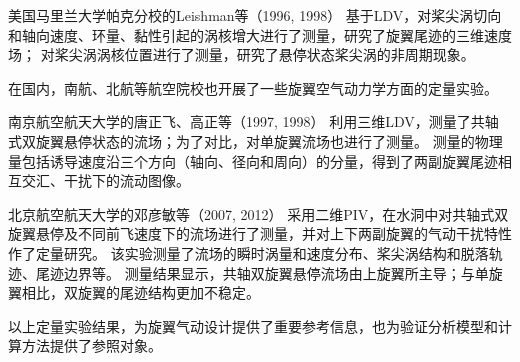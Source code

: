 \documentclass[doctor,openright,twoside,color]{buaathesis}
\begin{document}
美国马里兰大学帕克分校的Leishman等（1996, 1998）
基于LDV，对桨尖涡切向和轴向速度、环量、黏性引起的涡核增大进行了测量，研究了旋翼尾迹的三维速度场；
对桨尖涡涡核位置进行了测量，研究了悬停状态桨尖涡的非周期现象。

在国内，南航、北航等航空院校也开展了一些旋翼空气动力学方面的定量实验。

南京航空航天大学的唐正飞、高正等（1997, 1998）
利用三维LDV，测量了共轴式双旋翼悬停状态的流场；为了对比，对单旋翼流场也进行了测量。
测量的物理量包括诱导速度沿三个方向（轴向、径向和周向）的分量，得到了两副旋翼尾迹相互交汇、干扰下的流动图像。

北京航空航天大学的邓彦敏等（2007, 2012）
采用二维PIV，在水洞中对共轴式双旋翼悬停及不同前飞速度下的流场进行了测量，并对上下两副旋翼的气动干扰特性作了定量研究。
该实验测量了流场的瞬时涡量和速度分布、桨尖涡结构和脱落轨迹、尾迹边界等。
测量结果显示，共轴双旋翼悬停流场由上旋翼所主导；与单旋翼相比，双旋翼的尾迹结构更加不稳定。

以上定量实验结果，为旋翼气动设计提供了重要参考信息，也为验证分析模型和计算方法提供了参照对象。
\end{document}
